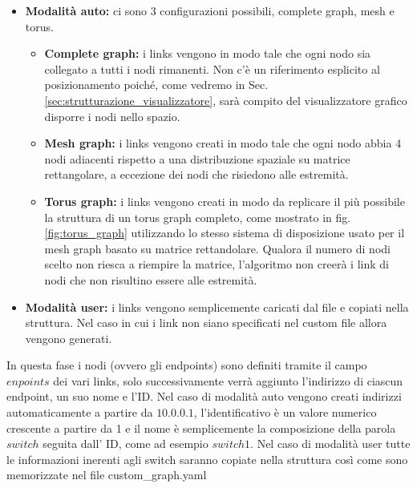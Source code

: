 \documentclass[binding=0.6cm]{sapthesis}
\begin{document}
\begin{itemize}
    \item \textbf{Modalità auto:} ci sono 3 configurazioni possibili, complete graph, mesh e torus.
    \begin{itemize}
        \item \textbf{Complete graph:} i links vengono in modo tale che ogni nodo sia collegato a tutti i nodi rimanenti. Non c'è un riferimento esplicito al posizionamento poiché, come vedremo in Sec. \ref{sec:strutturazione_visualizzatore}, sarà compito del visualizzatore grafico disporre i nodi nello spazio.
        \item \textbf{Mesh graph: } i links vengono creati in modo tale che ogni nodo abbia 4 nodi adiacenti rispetto a una distribuzione spaziale su matrice rettangolare, a eccezione dei nodi che risiedono alle estremità.
        \item \textbf{Torus graph: } i links vengono creati in modo da replicare il più possibile la struttura di un torus graph completo, come mostrato in fig. \ref{fig:torus_graph} utilizzando lo stesso sistema di disposizione usato per il mesh graph basato su matrice rettandolare.
        Qualora il numero di nodi scelto non riesca a riempire la matrice, l'algoritmo non creerà i link di nodi che non risultino essere alle estremità.
    \end{itemize} 
    \item \textbf{Modalità user:} i links vengono semplicemente caricati dal file e copiati nella struttura. Nel caso in cui i link non siano specificati nel custom file allora vengono generati.
\end{itemize}
In questa fase i nodi (ovvero gli endpoints) sono definiti tramite il campo \(enpoints\) dei vari links, solo successivamente verrà aggiunto l'indirizzo di ciascun endpoint, un suo nome e l'ID.
Nel caso di modalità auto vengono creati indirizzi automaticamente a partire da \(10.0.0.1\), l'identificativo è un valore numerico crescente a partire da 1 e il nome è semplicemente la composizione
della parola \(switch\) seguita dall' ID, come ad esempio \(switch1\).
Nel caso di modalità user tutte le informazioni inerenti agli switch saranno copiate nella struttura così come sono memorizzate nel file custom\_graph.yaml
\end{document}
